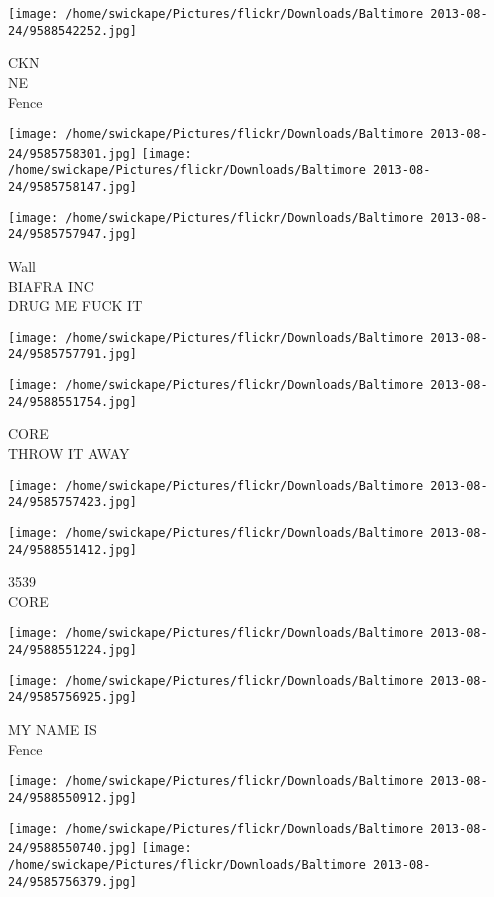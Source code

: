 \documentclass[10pt,letterpaper]{article}
\begin{document}
\vspace{0.25in}
\texttt{[image: /home/swickape/Pictures/flickr/Downloads/Baltimore 2013-08-24/9588542252.jpg]}

CKN\\
NE\\
Fence
\pagebreak

\texttt{[image: /home/swickape/Pictures/flickr/Downloads/Baltimore 2013-08-24/9585758301.jpg]}
\texttt{[image: /home/swickape/Pictures/flickr/Downloads/Baltimore 2013-08-24/9585758147.jpg]}

\texttt{[image: /home/swickape/Pictures/flickr/Downloads/Baltimore 2013-08-24/9585757947.jpg]}

Wall\\
BIAFRA INC\\
DRUG ME FUCK IT
\pagebreak

\texttt{[image: /home/swickape/Pictures/flickr/Downloads/Baltimore 2013-08-24/9585757791.jpg]}

\vspace{0.25in}
\texttt{[image: /home/swickape/Pictures/flickr/Downloads/Baltimore 2013-08-24/9588551754.jpg]}

CORE\\
THROW IT AWAY
\pagebreak

\texttt{[image: /home/swickape/Pictures/flickr/Downloads/Baltimore 2013-08-24/9585757423.jpg]}

\vspace{0.25in}
\texttt{[image: /home/swickape/Pictures/flickr/Downloads/Baltimore 2013-08-24/9588551412.jpg]}

3539\\
CORE
\pagebreak

\texttt{[image: /home/swickape/Pictures/flickr/Downloads/Baltimore 2013-08-24/9588551224.jpg]}

\vspace{0.25in}
\texttt{[image: /home/swickape/Pictures/flickr/Downloads/Baltimore 2013-08-24/9585756925.jpg]}

MY NAME IS\\
Fence
\pagebreak

\texttt{[image: /home/swickape/Pictures/flickr/Downloads/Baltimore 2013-08-24/9588550912.jpg]}

\vspace{0.25in}
\texttt{[image: /home/swickape/Pictures/flickr/Downloads/Baltimore 2013-08-24/9588550740.jpg]}
\texttt{[image: /home/swickape/Pictures/flickr/Downloads/Baltimore 2013-08-24/9585756379.jpg]}
\end{document}
